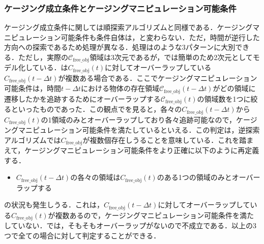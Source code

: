 \documentclass[a4paper,twoside,12pt,papersize, dvipdfmx]{iirthesis}
\begin{document}
\subsubsection{ケージング成立条件とケージングマニピュレーション可能条件}\label{subsec::planner::revcm}
ケージング成立条件に関しては順探索アルゴリズムと同様である．ケージングマニピュレーション可能条件も条件自体は，と変わらない．ただ，時間が逆行した方向への探索であるため処理が異なる．処理はのような3パターンに大別できる．ただし，実際の$\mathcal{C}_{\mathrm{free\_obj}}$領域は3次元であるが，では簡単のため2次元としてモデル化している．は$C_{\mathrm{free\_obj}}(t)$に対してオーバーラップしている$C_{\mathrm{free\_obj}}(t-\Delta t)$が複数ある場合である．ここでケージングマニピュレーション可能条件は，時間$t-\Delta t$における物体の存在領域$\mathcal{C}_{\mathrm{free\_obj}}(t-\Delta t)$がどの領域に遷移したかを追跡するためにオーバーラップする$\mathcal{C}_{\mathrm{free\_obj}}(t)$の領域数を1つに絞るといったものであった．この観点でを見ると，各々の$C_{\mathrm{free\_obj}}(t-\Delta t)$から$C_{\mathrm{free\_obj}}(t)$の1領域のみとオーバーラップしており各々追跡可能なので，ケージングマニピュレーション可能条件を満たしているといえる．この判定は，逆探索アルゴリズムでは$C_{\mathrm{free\_obj}}$が複数個存在しうることを意味している．これを踏まえて，ケージングマニピュレーション可能条件をより正確に以下のように再定義する．
\begin{itemize}
\item $C_{\mathrm{free\_obj}}(t-\Delta t)$の各々の領域は$C_{\mathrm{free\_obj}}(t)$のある1つの領域のみとオーバーラップする
\end{itemize}

の状況も発生しうる．これは，$C_{\mathrm{free\_obj}}(t-\Delta t)$に対してオーバーラップしている$C_{\mathrm{free\_obj}}(t)$が複数あるので，ケージングマニピュレーション可能条件を満たしていない．では，そもそもオーバーラップがないので不成立である．以上の3つで全ての場合に対して判定することができる．
\end{document}

